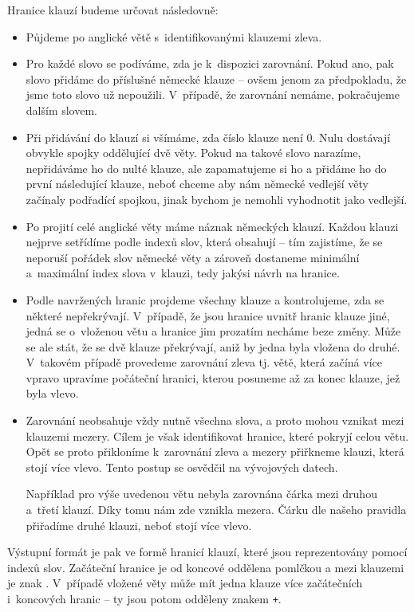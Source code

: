 \documentclass[12pt,a4paper]{report}
\begin{document}
Hranice klauzí budeme určovat následovně:
\begin{itemize}
\item{Půjdeme po anglické větě s~identifikovanými klauzemi zleva.}
\item{Pro každé slovo se podíváme, zda je k~dispozici zarovnání. Pokud ano, pak slovo přidáme do příslušné německé klauze -- ovšem jenom za předpokladu, že jsme toto slovo už nepoužili. V~případě, že zarovnání nemáme, pokračujeme dalším slovem.}
\item{Při přidávání do klauzí si všímáme, zda číslo klauze není 0. Nulu dostávají obvykle spojky oddělující dvě věty. Pokud na takové slovo narazíme, nepřidáváme ho do nulté klauze, ale zapamatujeme si ho a přidáme ho do první následující klauze, neboť chceme aby nám německé vedlejší věty začínaly podřadící spojkou, jinak bychom je nemohli vyhodnotit jako vedlejší.}
\item{Po projití celé anglické věty máme náznak německých klauzí. Každou klauzi nejprve setřídíme podle indexů slov, která obsahují -- tím zajistíme, že se neporuší pořádek slov německé věty a zároveň dostaneme minimální a~maximální index slova v~klauzi, tedy jakýsi návrh na hranice.}
\item{Podle navržených hranic projdeme všechny klauze a kontrolujeme, zda se některé nepřekrývají. V~případě, že jsou hranice uvnitř hranic klauze jiné, jedná se o~vloženou větu a hranice jim prozatím necháme beze změny. Může se ale stát, že se dvě klauze překrývají, aniž by jedna byla vložena do druhé. V~takovém případě provedeme zarovnání zleva tj. větě, která začíná více vpravo upravíme počáteční hranici, kterou posuneme až za konec klauze, jež byla vlevo.}
\item{Zarovnání neobsahuje vždy nutně všechna slova, a proto mohou vznikat mezi klauzemi mezery. Cílem je však identifikovat hranice, které pokryjí celou větu. Opět se proto přikloníme k~zarovnání zleva a mezery přiřkneme klauzi, která stojí více vlevo. Tento postup se osvědčil na vývojových datech.}

Například pro výše uvedenou větu nebyla zarovnána čárka mezi druhou a~třetí klauzí. Díky tomu nám zde vznikla mezera. Čárku dle našeho pravidla přiřadíme druhé klauzi, neboť stojí více vlevo.
\end{itemize}

Výstupní formát je pak ve formě hranicí klauzí, které jsou reprezentovány pomocí indexů slov. Začáteční hranice je od koncové oddělena pomlčkou a mezi klauzemi je znak \texttt{\textbar}. V~případě vložené věty může mít jedna klauze více začátečních i~koncových hranic -- ty jsou potom odděleny znakem \texttt{+}.
\end{document}
